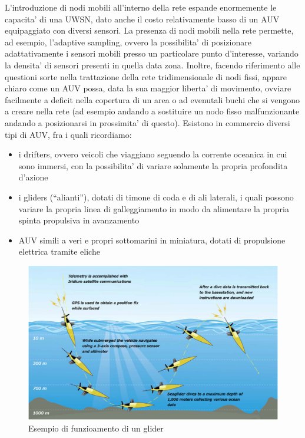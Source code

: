L'introduzione di nodi mobili all'interno della rete espande enormemente le capacita' di una UWSN, dato anche il costo relativamente basso di un AUV equipaggiato con diversi sensori. La presenza di nodi mobili nella rete permette, ad esempio, l'adaptive sampling, ovvero la possibilita' di posizionare adattativamente i sensori mobili presso un particolare punto d'interesse, variando la densita' di sensori presenti in quella data zona. Inoltre, facendo riferimento alle questioni sorte nella trattazione della rete tridimensionale di nodi fissi, appare chiaro come un AUV possa, data la sua maggior liberta' di movimento, ovviare facilmente a deficit nella copertura di un area o ad evenutali buchi che si vengono a creare nella rete (ad esempio andando a sostituire un nodo fisso malfunzionante andando a posizionarsi in prossimita' di questo).
Esistono in commercio diversi tipi di AUV, fra i quali ricordiamo:
\begin{itemize}

\item i drifters, ovvero veicoli che viaggiano seguendo la corrente oceanica in cui sono immersi, con la possibilita' di variare solamente la propria
profondita d'azione

\item i gliders (``alianti''), dotati di timone di coda e di ali laterali, i quali possono variare la propria linea di galleggiamento in modo da alimentare la propria spinta propulsiva in avanzamento

\item AUV simili a veri e propri sottomarini in miniatura, dotati di propulsione elettrica tramite eliche

\end{itemize}
\begin{figure}[H]
    \centering
	\includegraphics[width=\linewidth]{glider.jpg}
	\caption{ Esempio di funzioamento di un glider}
	\label{fig:}
\end{figure}



